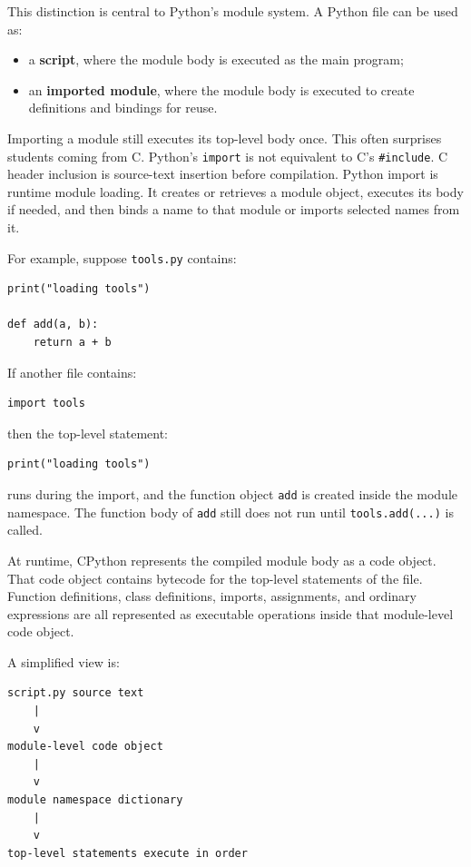 \documentclass[a4paper,twoside]{report}
\begin{document}
This distinction is central to Python's module system. A Python file can be used as:

\begin{itemize}
    \item a \textbf{script}, where the module body is executed as the main program;
    \item an \textbf{imported module}, where the module body is executed to create definitions and bindings for reuse.
\end{itemize}

Importing a module still executes its top-level body once. This often surprises students coming from C. Python's \texttt{import} is not equivalent to C's \texttt{\#include}. C header inclusion is source-text insertion before compilation. Python import is runtime module loading. It creates or retrieves a module object, executes its body if needed, and then binds a name to that module or imports selected names from it.

For example, suppose \texttt{tools.py} contains:

\begin{verbatim}
print("loading tools")

def add(a, b):
    return a + b
\end{verbatim}

If another file contains:

\begin{verbatim}
import tools
\end{verbatim}

then the top-level statement:

\begin{verbatim}
print("loading tools")
\end{verbatim}

runs during the import, and the function object \texttt{add} is created inside the module namespace. The function body of \texttt{add} still does not run until \texttt{tools.add(...)} is called.

At runtime, CPython represents the compiled module body as a code object. That code object contains bytecode for the top-level statements of the file. Function definitions, class definitions, imports, assignments, and ordinary expressions are all represented as executable operations inside that module-level code object.

A simplified view is:

\begin{verbatim}
script.py source text
    |
    v
module-level code object
    |
    v
module namespace dictionary
    |
    v
top-level statements execute in order
\end{verbatim}
\end{document}
